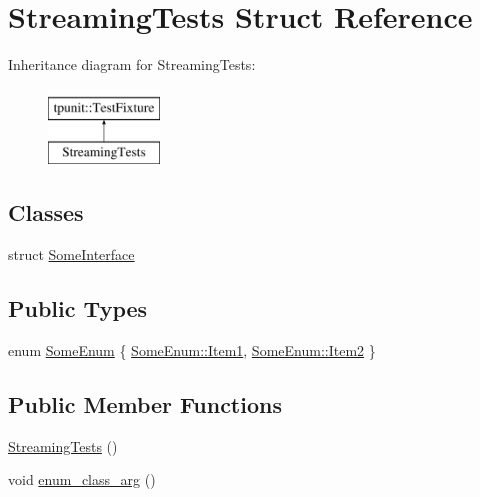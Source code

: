 \hypertarget{structStreamingTests}{}\section{Streaming\+Tests Struct Reference}
\label{structStreamingTests}
Inheritance diagram for Streaming\+Tests\+:\begin{figure}[H]
\begin{center}
\leavevmode
\includegraphics[height=2.000000cm]{structStreamingTests}
\end{center}
\end{figure}
\subsection*{Classes}
\begin{DoxyCompactItemize}
\item 
struct \mbox{\hyperlink{structStreamingTests_1_1SomeInterface}{Some\+Interface}}
\end{DoxyCompactItemize}
\subsection*{Public Types}
\begin{DoxyCompactItemize}
\item 
enum \mbox{\hyperlink{structStreamingTests_a52e6d080d76d5c4fcdaed3eecc52ae39}{Some\+Enum}} \{ \mbox{\hyperlink{structStreamingTests_a52e6d080d76d5c4fcdaed3eecc52ae39a85548eb013e5698455ca0fcd3b423330}{Some\+Enum\+::\+Item1}}, 
\mbox{\hyperlink{structStreamingTests_a52e6d080d76d5c4fcdaed3eecc52ae39a221d8e24f86fe4225eaad5cd756b65b7}{Some\+Enum\+::\+Item2}}
 \}
\end{DoxyCompactItemize}
\subsection*{Public Member Functions}
\begin{DoxyCompactItemize}
\item 
\mbox{\hyperlink{structStreamingTests_aeb11ae4abffaf5de21b9c0bfd82a6a88}{Streaming\+Tests}} ()
\item 
void \mbox{\hyperlink{structStreamingTests_a883c42aa2543efda0f52fa48a85d4b17}{enum\+\_\+class\+\_\+arg}} ()
\end{DoxyCompactItemize}
